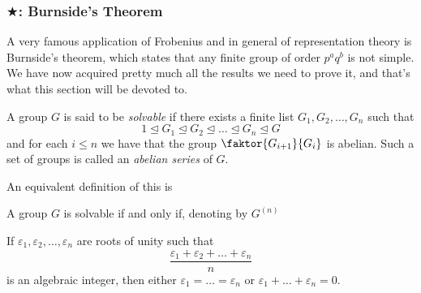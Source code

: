 \documentclass[11pt]{scrartcl}
\newcommand{\normal}{\mathrel{\unlhd}}
\begin{document}
	\subsubsection{$\bigstar$: Burnside's Theorem}
	A very famous application of Frobenius and in general of representation theory is Burnside's theorem, which states that any finite group of order $p^aq^b$ is not simple. We have now acquired pretty much all the results we need to prove it, and that's what this section will be devoted to.
	\begin{definition}
		A group $G$ is said to be \textit{solvable} if there exists a finite list $G_1,G_2,\dots,G_n$ such that
		$$1 \normal  G_1 \normal G_2 \normal\dots \normal G_n\normal G$$
		and for each $i\le n$ we have that the group $\faktor{G_{i+1}}{G_i}$ is abelian. Such a set of groups is called an \textit{abelian series} of $G$.
	\end{definition}
	An equivalent definition of this is
	\begin{proposition}
		A group $G$ is solvable if and only if, denoting by $G^{(n)}$
	\end{proposition}
	\begin{lemma}
		If $\varepsilon_1,\varepsilon_2,\dots,\varepsilon_n$ are roots of unity such that
		$$\frac{\varepsilon_1+\varepsilon_2+\dots+\varepsilon_n}{n}$$
		is an algebraic integer, then either $\varepsilon_1=\dots =\varepsilon_n$ or $\varepsilon_1+\dots+\varepsilon_n=0$.
	\end{lemma}
	
\end{document}
